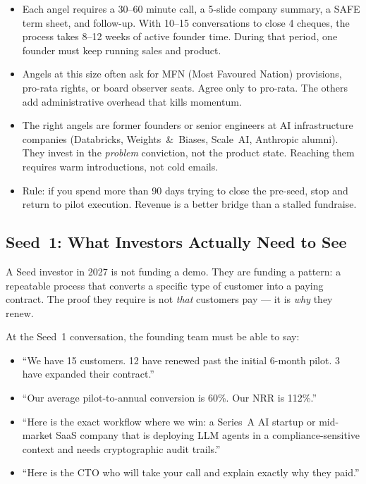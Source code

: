 \begin{itemize}[leftmargin=1.5em, itemsep=4pt]
  \item Each angel requires a 30--60 minute call, a 5-slide company summary,
        a SAFE term sheet, and follow-up. With 10--15 conversations to close
        4 cheques, the process takes 8--12 weeks of active founder time.
        During that period, one founder must keep running sales and product.

  \item Angels at this size often ask for MFN (Most Favoured Nation)
        provisions, pro-rata rights, or board observer seats. Agree only to
        pro-rata. The others add administrative overhead that kills momentum.

  \item The right angels are former founders or senior engineers at AI
        infrastructure companies (Databricks, Weights~\&~Biases, Scale~AI,
        Anthropic alumni). They invest in the \emph{problem} conviction, not
        the product state. Reaching them requires warm introductions, not
        cold emails.

  \item Rule: if you spend more than 90 days trying to close the pre-seed,
        stop and return to pilot execution. Revenue is a better bridge than
        a stalled fundraise.
\end{itemize}

\subsection*{Seed~1: What Investors Actually Need to See}

A Seed investor in 2027 is not funding a demo. They are funding a pattern:
a repeatable process that converts a specific type of customer into a paying
contract. The proof they require is not \emph{that} customers pay --- it is
\emph{why} they renew.

At the Seed~1 conversation, the founding team must be able to say:

\begin{itemize}[leftmargin=1.5em, itemsep=3pt]
  \item ``We have 15 customers. 12 have renewed past the initial 6-month
        pilot. 3 have expanded their contract.''
  \item ``Our average pilot-to-annual conversion is 60\%. Our NRR is 112\%.''
  \item ``Here is the exact workflow where we win: a Series~A AI startup or
        mid-market SaaS company that is deploying LLM agents in a
        compliance-sensitive context and needs cryptographic audit trails.''
  \item ``Here is the CTO who will take your call and explain exactly why
        they paid.''
\end{itemize}


